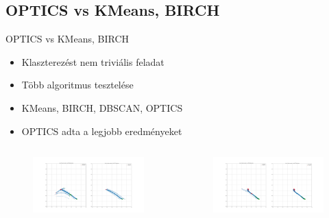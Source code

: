 \documentclass{beamer}
\begin{document}
\subsection{OPTICS vs KMeans, BIRCH}
\begin{frame}{OPTICS vs KMeans, BIRCH}
    \begin{itemize}
        \item Klaszterezést nem triviális feladat
        \item Több algoritmus tesztelése
        \item KMeans, BIRCH, DBSCAN, OPTICS
        \item OPTICS adta a legjobb eredményeket
    \end{itemize}
    \begin{columns}
        \begin{figure}
            \includegraphics[scale=0.08]{../bad_clustering/example_kmeans_vs_optics.png}
        \end{figure}
        \begin{figure}
            \includegraphics[scale=0.08]{../bad_clustering/example_birch_vs_optics.png}
        \end{figure}
    \end{columns}
\end{frame}
\end{document}
